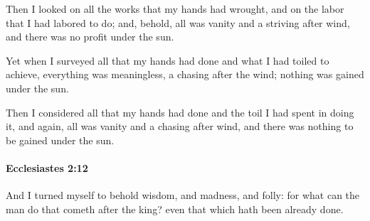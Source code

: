 			\begin{versebox}
					\item[BHS] 
					\item[LXX] 
					\item[ASV] Then I looked on all the works that my hands had wrought, and on the labor that I had labored to do; and, behold, all was vanity and a striving after wind, and there was no profit under the sun.
					\item[NIV] Yet when I surveyed all that my hands had done and what I had toiled to achieve, everything was meaningless, a chasing after the wind; nothing was gained under the sun.
					\item[NRSV] Then I considered all that my hands had done and the toil I had spent in doing it, and again, all was vanity and a chasing after wind, and there was nothing to be gained under the sun.
			\end{versebox}

		\paragraph{Ecclesiastes 2:12} %
			\label{ECCLESIASTES-2-12}

			And I turned myself to behold wisdom, and madness, and folly: for what can the man do that cometh after the king? even that which hath been already done.

